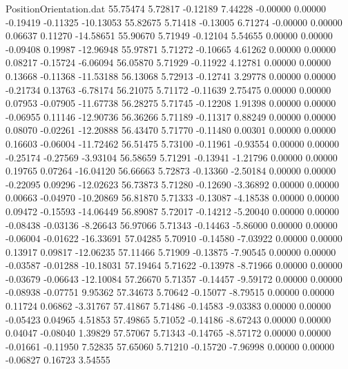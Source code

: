 \begin{filecontents}{PositionOrientation.dat}
  55.75474    5.72817   -0.12189     7.44228   -0.00000    0.00000   -0.19419   -0.11325  -10.13053
  55.82675    5.71418   -0.13005     6.71274   -0.00000    0.00000    0.06637    0.11270  -14.58651
  55.90670    5.71949   -0.12104     5.54655    0.00000    0.00000   -0.09408    0.19987  -12.96948
  55.97871    5.71272   -0.10665     4.61262    0.00000    0.00000    0.08217   -0.15724   -6.06094
  56.05870    5.71929   -0.11922     4.12781    0.00000    0.00000    0.13668   -0.11368  -11.53188
  56.13068    5.72913   -0.12741     3.29778    0.00000    0.00000   -0.21734    0.13763   -6.78174
  56.21075    5.71172   -0.11639     2.75475    0.00000    0.00000    0.07953   -0.07905  -11.67738
  56.28275    5.71745   -0.12208     1.91398    0.00000    0.00000   -0.06955    0.11146  -12.90736
  56.36266    5.71189   -0.11317     0.88249    0.00000    0.00000    0.08070   -0.02261  -12.20888
  56.43470    5.71770   -0.11480     0.00301    0.00000    0.00000    0.16603   -0.06004  -11.72462
  56.51475    5.73100   -0.11961    -0.93554    0.00000    0.00000   -0.25174   -0.27569   -3.93104
  56.58659    5.71291   -0.13941    -1.21796    0.00000    0.00000    0.19765    0.07264  -16.04120
  56.66663    5.72873   -0.13360    -2.50184    0.00000    0.00000   -0.22095    0.09296  -12.02623
  56.73873    5.71280   -0.12690    -3.36892    0.00000    0.00000    0.00663   -0.04970  -10.20869
  56.81870    5.71333   -0.13087    -4.18538    0.00000    0.00000    0.09472   -0.15593  -14.06449
  56.89087    5.72017   -0.14212    -5.20040    0.00000    0.00000   -0.08438   -0.03136   -8.26643
  56.97066    5.71343   -0.14463    -5.86000    0.00000    0.00000   -0.06004   -0.01622  -16.33691
  57.04285    5.70910   -0.14580    -7.03922    0.00000    0.00000    0.13917    0.09817  -12.06235
  57.11466    5.71909   -0.13875    -7.90545    0.00000    0.00000   -0.03587   -0.01288  -10.18031
  57.19464    5.71622   -0.13978    -8.71966    0.00000    0.00000   -0.03679   -0.06643  -12.10084
  57.26670    5.71357   -0.14457    -9.59172    0.00000    0.00000   -0.08938   -0.07751    9.95362
  57.34673    5.70642   -0.15077    -8.79515    0.00000    0.00000    0.11724    0.06862   -3.31767
  57.41867    5.71486   -0.14583    -9.03383    0.00000    0.00000   -0.05423    0.04965    4.51853
  57.49865    5.71052   -0.14186    -8.67243    0.00000    0.00000    0.04047   -0.08040    1.39829
  57.57067    5.71343   -0.14765    -8.57172    0.00000    0.00000   -0.01661   -0.11950    7.52835
  57.65060    5.71210   -0.15720    -7.96998    0.00000    0.00000   -0.06827    0.16723    3.54555

\end{filecontents}
